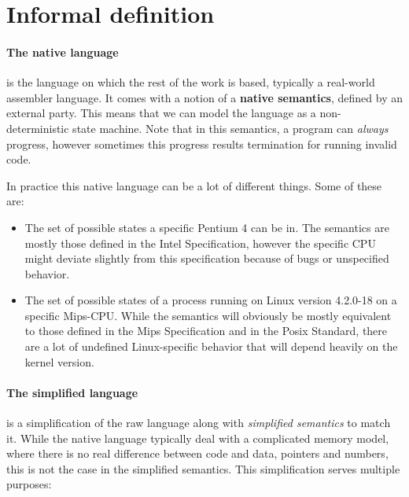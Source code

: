 \section{Informal definition}
\paragraph{The native language} is the language on which the rest of the work is
based, typically a real-world assembler language. It comes with a notion of a
\textbf{native semantics}, defined by an external party. This means that we can
model the language as a non-deterministic state machine. Note that in this
semantics, a program can \emph{always} progress, however sometimes this progress
results termination for running invalid code.

In practice this native language can be a lot of different things. Some of these
are:

\begin{itemize}
\item The set of possible states a specific Pentium 4 can be in. The semantics
  are mostly those defined in the Intel Specification\cite{intelsys}, however
  the specific CPU might deviate slightly from this specification because of
  bugs or unspecified behavior.
\item The set of possible states of a process running on Linux version 4.2.0-18
  on a specific Mips-CPU. While the semantics will obviously be mostly
  equivalent to those defined in the Mips Specification\cite{mipssys} and in the
  Posix Standard\cite{posix}, there are a lot of undefined Linux-specific
  behavior that will depend heavily on the kernel version.
\end{itemize}


\paragraph{The simplified language} is a simplification of the raw language
along with \emph{simplified semantics} to match it. While the native language
typically deal with a complicated memory model, where there is no real
difference between code and data, pointers and numbers, this is not the case in
the simplified semantics. This simplification serves multiple purposes:

